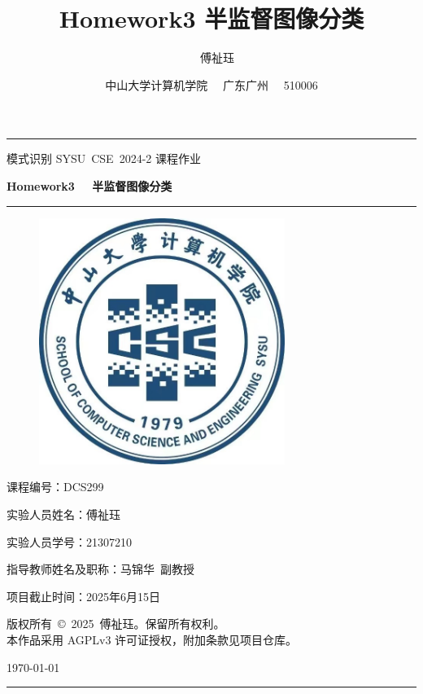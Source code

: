 \documentclass[a4paper, utf8]{ctexart}
\title{\songti \Large \textbf{Homework3 \quad 半监督图像分类}}
\author{\fangsong 21307210 \ \  傅祉珏}
\date{\fangsong 中山大学计算机学院 \ \  广东广州 \ \  510006}
\renewcommand*{\songti}{\CJKfamily{zhsong}}
\begin{document}
	\begin{titlepage}
		\centering
		\rule{\textwidth}{1pt}
		\vspace{0.02\textheight}
		
		{\LARGE \kaishu 模式识别 \quad SYSU\ CSE\ 2024-2 \quad 课程作业}
		
		\vspace{0.02\textheight}
		
		{\Huge \songti \bfseries Homework3 \ \  半监督图像分类}
		
		\vspace{0.025\textheight}
		\rule{0.83\textwidth}{0.4pt}
		\vspace{0.025\textheight}
		\begin{figure}[htbp]
			\centering
			\includegraphics[width=8cm, height=8cm]{./figure/计院院徽.jpg}
		\end{figure}
		
		\vspace{0.035\textheight} 
		{\Large 课程编号：\textsc{DCS299}}
		
		\vspace{0.025\textheight} 
		{\Large 实验人员姓名：\textsc{傅祉珏}}
		
		\vspace{0.025\textheight} 
		{\Large 实验人员学号：\textsc{21307210}}
		
		\vspace{0.025\textheight} 
		{\Large 指导教师姓名及职称：\textsc{马锦华\ 副教授}}
		
		\vspace{0.025\textheight} 
		{\Large 项目截止时间：\textsc{2025年6月15日}}
		
		\vspace{0.025\textheight} 
		{\small \kaishu 版权所有\ \copyright\ 2025\ 傅祉珏。保留所有权利。\\
		本作品采用 AGPLv3 许可证授权，附加条款见项目仓库。}
		
		\vspace{0.025\textheight} 
		{\large \today}
		\vspace{0.1\textheight}
		\rule{\textwidth}{1pt}
	\end{titlepage}
	\let\cleardoublepage\clearpage
	
\end{document}
